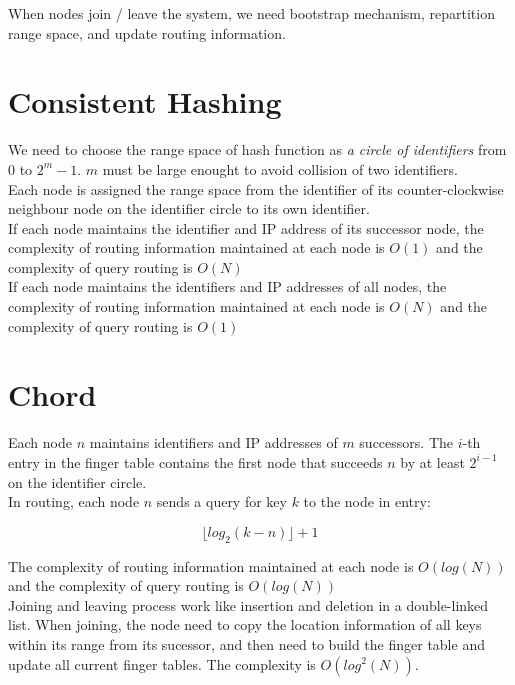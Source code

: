 \begin{multicols*}{2}
\noindent When nodes join / leave the system, we need bootstrap mechanism, repartition range space, and update routing information. 

\section{Consistent Hashing}

\noindent We need to choose the range space of hash function as \emph{a circle of identifiers} from $0$ to $2^m -1$. $m$ must be large enought to avoid collision of two identifiers. \\

\noindent Each node is assigned the range space from the identifier of its counter-clockwise neighbour node on the identifier circle to its own identifier.\\

\noindent If each node maintains the identifier and IP address of its successor node, the complexity of routing information maintained at each node is $O(1)$ and the complexity of query routing is $O(N)$\\

\noindent If each node maintains the identifiers and IP addresses of all nodes, the complexity of routing information maintained at each node is $O(N)$ and the complexity of query routing is $O(1)$

\section{Chord}

\noindent Each node $n$ maintains identifiers and IP addresses of $m$ successors. The $i$-th entry in the finger table contains the first node that succeeds $n$ by at least $2^{i-1}$ on the identifier circle. \\

\noindent In routing, each node $n$ sends a query for key $k$ to the node in entry:

$$\lfloor log_2(k-n) \rfloor + 1$$

\noindent The complexity of routing information maintained at each node is $O(log(N))$ and the complexity of query routing is $O(log(N))$\\

\noindent Joining and leaving process work like insertion and deletion in a double-linked list. When joining, the node need to copy the location information of all keys within its range from its sucessor, and then need to build the finger table and update all current finger tables. The complexity is $O(log^2(N))$.


\end{multicols*}

